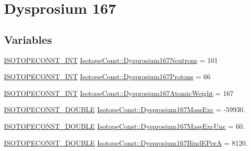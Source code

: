 \hypertarget{group___isotope_const-_dysprosium-_dy167}{}\section{Dysprosium 167}
\label{group___isotope_const-_dysprosium-_dy167}
\subsection*{Variables}
\begin{DoxyCompactItemize}
\item 
\mbox{\hyperlink{group___isotope_const-_macros_ga5f18360b3e99483a35c32d789e62621c}{I\+S\+O\+T\+O\+P\+E\+C\+O\+N\+S\+T\+\_\+\+I\+NT}} \mbox{\hyperlink{group___isotope_const-_dysprosium-_dy167_ga14071d223b92839bfb97bfe9a8a6c868}{Isotope\+Const\+::\+Dysprosium167\+Neutrons}} = 101
\item 
\mbox{\hyperlink{group___isotope_const-_macros_ga5f18360b3e99483a35c32d789e62621c}{I\+S\+O\+T\+O\+P\+E\+C\+O\+N\+S\+T\+\_\+\+I\+NT}} \mbox{\hyperlink{group___isotope_const-_dysprosium-_dy167_gabb497876e1d0bdf8cf343c537a3b9ab1}{Isotope\+Const\+::\+Dysprosium167\+Protons}} = 66
\item 
\mbox{\hyperlink{group___isotope_const-_macros_ga5f18360b3e99483a35c32d789e62621c}{I\+S\+O\+T\+O\+P\+E\+C\+O\+N\+S\+T\+\_\+\+I\+NT}} \mbox{\hyperlink{group___isotope_const-_dysprosium-_dy167_ga029dc4a670d69c7846ba256c85c07af1}{Isotope\+Const\+::\+Dysprosium167\+Atomic\+Weight}} = 167
\item 
\mbox{\hyperlink{group___isotope_const-_macros_ga8f45a7272ce02c0b4c65c44636ed719a}{I\+S\+O\+T\+O\+P\+E\+C\+O\+N\+S\+T\+\_\+\+D\+O\+U\+B\+LE}} \mbox{\hyperlink{group___isotope_const-_dysprosium-_dy167_ga20158a0c6136b6aa25a322255169553f}{Isotope\+Const\+::\+Dysprosium167\+Mass\+Exc}} = -\/59930.
\item 
\mbox{\hyperlink{group___isotope_const-_macros_ga8f45a7272ce02c0b4c65c44636ed719a}{I\+S\+O\+T\+O\+P\+E\+C\+O\+N\+S\+T\+\_\+\+D\+O\+U\+B\+LE}} \mbox{\hyperlink{group___isotope_const-_dysprosium-_dy167_ga1f59b7f2422e3214df0ef088a496af1a}{Isotope\+Const\+::\+Dysprosium167\+Mass\+Exc\+Unc}} = 60.
\item 
\mbox{\hyperlink{group___isotope_const-_macros_ga8f45a7272ce02c0b4c65c44636ed719a}{I\+S\+O\+T\+O\+P\+E\+C\+O\+N\+S\+T\+\_\+\+D\+O\+U\+B\+LE}} \mbox{\hyperlink{group___isotope_const-_dysprosium-_dy167_ga2c35a793b145cd0a4494e0455b54e5a0}{Isotope\+Const\+::\+Dysprosium167\+Bind\+E\+PerA}} = 8120.

\end{DoxyCompactItemize}
